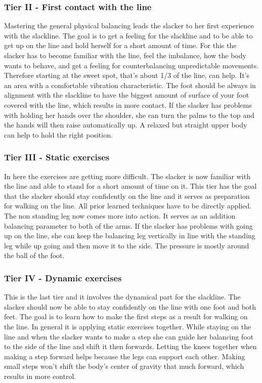 \subsubsection{Tier II - First contact with the line}
Mastering the general physical balancing leads the slacker to her first experience with the slackline. The goal is to get a feeling for the slackline and to be able to get up on the line and hold herself for a short amount of time. For this the slacker has to become familiar with the line, feel the imbalance, how the body wants to behave, and get a feeling for counterbalancing unpredictable movements. Therefore starting at the sweet spot, that's about 1/3 of the line, can help. It's an area with a comfortable vibration characteristic. The foot should be always in alignment with the slackline to have the biggest amount of surface of your foot covered with the line, which results in more contact. If the slacker has problems with holding her hands over the shoulder, she can turn the palms to the top and the hands will then raise automatically up. A relaxed but straight upper body can help to hold the right position.

\subsubsection{Tier III - Static exercises}
In here the exercises are getting more difficult. The slacker is now familiar with the line and able to stand for a short amount of time on it. This tier has the goal that the slacker should stay confidently on the line and it serves as preparation for walking on the line. All prior learned techniques have to be directly applied. The non standing leg now comes more into action. It serves as an addition balancing parameter to both of the arms. If the slacker has problems with going up on the line, she can keep the balancing leg vertically in line with the standing leg while up going and then move it to the side. The pressure is mostly around the ball of the foot.

\subsubsection{Tier IV - Dynamic exercises}
This is the last tier and it involves the dynamical part for the slackline. The slacker should now be able to stay confidently on the line with one foot and both feet. The goal is to learn how to make the first steps as a result for walking on the line. In general it is applying static exercises together. While staying on the line and when the slacker wants to make a step she can guide her balancing foot to the side of the line and shift it then forwards. Letting the knees together when making a step forward helps because the legs can support each other. Making small steps won't shift the body's center of gravity that much forward, which results in more control.
